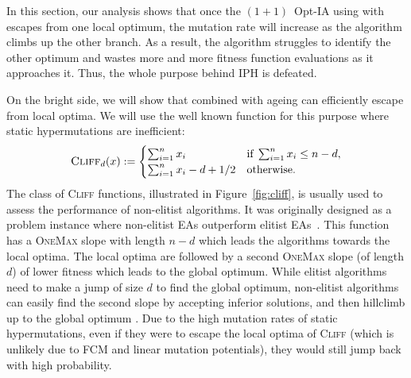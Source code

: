 \documentclass[lettersize,journal]{IEEEtran}
\begin{document}
 	In this section, our analysis shows that once the $(1+1)$~Opt-IA using \IPHfcm{} with \expoHD{}  escapes from one local optimum, the mutation rate will increase as the algorithm climbs up the other branch.
 	As a result, the algorithm struggles to identify the other optimum and wastes more and more fitness function evaluations as it approaches it. Thus, the whole purpose behind IPH is defeated.
 	
 	On the bright side, we will show that {\expoHD } combined with ageing can efficiently escape from local optima. We will use the well known \cliff{} function %
 	for this purpose where static hypermutations are inefficient:
 	\begin{equation} \label{func:cliff}
 		\textsc{Cliff}_{d}(x):=\begin{cases}
 			\sum_{i=1}^n x_i & \text{if}\; \sum_{i=1}^n x_i \leq n-d, \\
 			\sum_{i=1}^n x_i -d+ 1/2 & \text{otherwise.}
 		\end{cases}
 	\end{equation}
 	The class of \textsc{Cliff} functions, illustrated in Figure~\ref{fig:cliff}, is usually used to assess the performance of non-elitist algorithms. %
 	It was originally designed as a problem instance where non-elitist EAs outperform elitist EAs~\cite{JaegerskuepperStorch}. This function  has a \textsc{OneMax} slope with length $n-d$ which leads the algorithms towards the local optima. The local optima are followed by a second \textsc{OneMax} slope (of length $d$) of lower fitness which leads to the global optimum. While elitist algorithms need to make a jump of size $d$ to find the global optimum, non-elitist algorithms can easily find the second slope by accepting inferior solutions, %
 	and then hillclimb up to the global optimum \cite{LissovoiOlivetoWarwicker2019AAAI,CorusOlivetoYazdani2019TCS,CorusOlivetoYazdani2021TEVC,HeviaSudholtAlgo24}. 
 	Due to the high mutation rates of static hypermutations, even if they were to escape the local optima of \textsc{Cliff} (which is unlikely due to FCM and linear mutation potentials), they would still jump back with high probability.  
 	
 	
\end{document}
